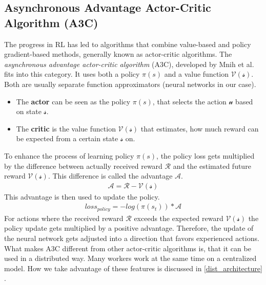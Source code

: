 \subsection*{Asynchronous Advantage Actor-Critic Algorithm (A3C)}\label{a3c_intro}
The progress in RL has led to algorithms that combine value-based and policy gradient-based methods, generally known as actor-critic algorithms. The \textit{asynchronous advantage actor-critic algorithm} (A3C), developed by Mnih et al. \cite{a3c} fits into this category. It uses both a policy $\pi(s)$ and a value function $\mathcal{V(s)}$.
Both are usually separate function approximators (neural networks in our case).
\begin{itemize}
	\item The \textbf{actor} can be seen as the policy $\pi(s)$, that selects the action $\mathcal{u}$ based on state $\mathcal{s}$.
	\item The \textbf{critic} is the value function $\mathcal{V(s)}$ that estimates, how much reward can be expected from a certain state  $\mathcal{s}$ on.
\end{itemize}
To enhance the process of learning policy $\pi(s)$, the policy loss gets multiplied by the difference between actually received reward $\mathcal{R}$ and the estimated future reward $\mathcal{V(s)}$. This difference is called the advantage $\mathcal{A}$.
\begin{gather*}
\mathcal{A}=\mathcal{R}-\mathcal{V(s)}
\end{gather*}
This advantage is then used to update the policy.
\begin{gather*}
loss_{policy}=-log(\pi(s_{t}))*\mathcal{A}
\end{gather*}
For actions where the received reward $\mathcal{R}$ exceeds the expected reward $\mathcal{V(s)}$ the policy update gets multiplied by a positive advantage. Therefore, the update of the neural network gets adjusted into a direction that favors experienced actions.\\
What makes A3C different from other actor-critic algorithms is, that it can be used in a distributed way. Many workers work at the same time on a centralized model. How we take advantage of these features is discussed in
\ref{dist_architecture} .

